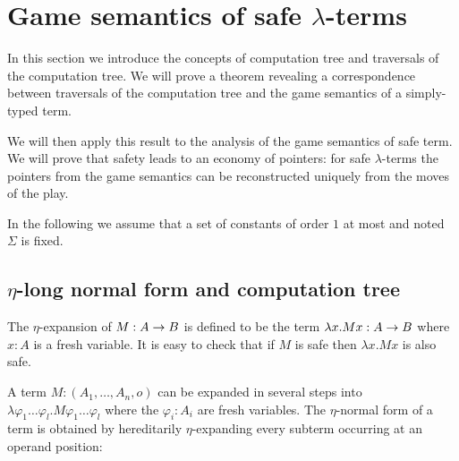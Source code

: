\def\cmptre#1{\tau(#1)}
\def\aux#1{\lceil #1\rceil}
\def\nf#1{\eta_{\sf nf}(#1)}

\section{Game semantics of safe $\lambda$-terms}

In this section we introduce the concepts of computation tree and
traversals of the computation tree. We will prove a theorem
revealing a correspondence between traversals of the computation
tree and the game semantics of a simply-typed term.

We will then apply this result to the analysis of the game semantics
of safe term. We will prove that safety leads to an economy of
pointers: for safe $\lambda$-terms the pointers from the game
semantics can be reconstructed uniquely from the moves of the play.

In the following we assume that a set of constants of order $1$ at
most and noted $\Sigma$ is fixed.
%
%

\subsection{$\eta$-long normal form and computation tree}

The $\eta$-expansion of $M: A\rightarrow B$ is defined to be the term $\lambda x . M x : A\rightarrow B$ where $x:A$ is a fresh variable.
It is easy to check that if $M$ is safe then $\lambda x . M x$ is also safe.

A term $M : (A_1,\ldots,A_n,o)$ can be expanded in several steps
into $\lambda \varphi_1 \ldots \varphi_l . M \varphi_1 \ldots
\varphi_l$ where the $\varphi_i:A_i$ are fresh variables. The
$\eta$-normal form of a term is obtained by hereditarily
$\eta$-expanding every subterm occurring at an operand position:

